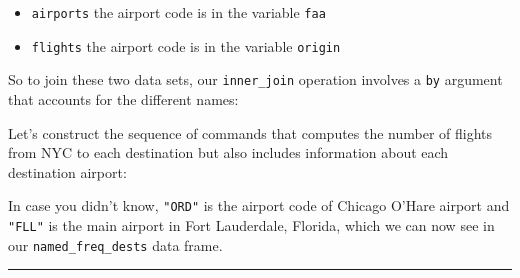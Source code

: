 \documentclass[]{tufte-book}
\newenvironment{Shaded}{\begin{snugshade}}{\end{snugshade}}
\newcommand{\KeywordTok}[1]{\textcolor[rgb]{0.13,0.29,0.53}{\textbf{{#1}}}}
\newcommand{\DataTypeTok}[1]{\textcolor[rgb]{0.13,0.29,0.53}{{#1}}}
\newcommand{\StringTok}[1]{\textcolor[rgb]{0.31,0.60,0.02}{{#1}}}
\newcommand{\NormalTok}[1]{{#1}}
\let\oldrule=\rule
\renewcommand{\rule}[1]{\oldrule{\linewidth}}
\providecommand{\tightlist}{%
  \setlength{\itemsep}{0pt}\setlength{\parskip}{0pt}}
\theoremstyle{definition}
\theoremstyle{definition}
\theoremstyle{remark}
\begin{document}
\begin{itemize}
\tightlist
\item
  \texttt{airports} the airport code is in the variable \texttt{faa}
\item
  \texttt{flights} the airport code is in the variable \texttt{origin}
\end{itemize}

So to join these two data sets, our \texttt{inner\_join} operation
involves a \texttt{by} argument that accounts for the different names:

\begin{Shaded}
\end{Shaded}

Let's construct the sequence of commands that computes the number of
flights from NYC to each destination but also includes information about
each destination airport:

\begin{Shaded}
\end{Shaded}

In case you didn't know, \texttt{"ORD"} is the airport code of Chicago
O'Hare airport and \texttt{"FLL"} is the main airport in Fort
Lauderdale, Florida, which we can now see in our
\texttt{named\_freq\_dests} data frame.

\begin{center}\rule{0.5\linewidth}{\linethickness}\end{center}
\end{document}
